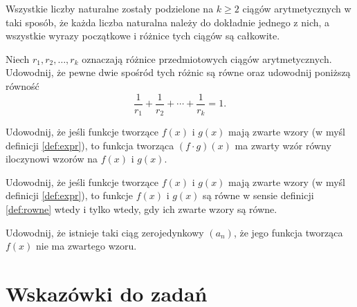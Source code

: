 \documentclass[shortabstract]{imthesis}
\begin{document}
\begin{problem} \label{problem:arithprogdiv}
Wszystkie liczby naturalne zostały podzielone na $k \geq 2$ ciągów arytmetycznych w taki sposób, że każda liczba naturalna należy do dokładnie jednego z nich, a wszystkie wyrazy początkowe i różnice tych ciągów są całkowite. 

Niech $r_1, r_2, \ldots, r_k$ oznaczają różnice przedmiotowych ciągów arytmetycznych. Udowodnij, że pewne dwie spośród tych różnic są równe oraz udowodnij poniższą równość
$$
\frac{1}{r_1} + \frac{1}{r_2} + \cdots + \frac{1}{r_k} = 1.
$$
\end{problem}

\begin{problem} \label{problem:formaldef}
Udowodnij, że jeśli funkcje tworzące $f(x)$ i $g(x)$ mają zwarte wzory (w myśl definicji \ref{def:expr}), to funkcja tworząca $(f\cdot g)(x)$ ma zwarty wzór równy iloczynowi wzorów na $f(x)$ i $g(x)$.
\end{problem}

\begin{problem} \label{problem:formaldefeq}
Udowodnij, że jeśli funkcje tworzące $f(x)$ i $g(x)$ mają zwarte wzory (w myśl definicji \ref{def:expr}), to funkcje $f(x)$ i $g(x)$ są równe w sensie definicji \ref{def:rowne} wtedy i tylko wtedy, gdy ich zwarte wzory są równe.
\end{problem}

\begin{problem} \label{problem:formaldefinfties}
Udowodnij, że istnieje taki ciąg zerojedynkowy $(a_n)$, że jego funkcja tworząca $f(x)$ nie ma zwartego wzoru.
\end{problem}

\chapter{Wskazówki do zadań}
\end{document}
